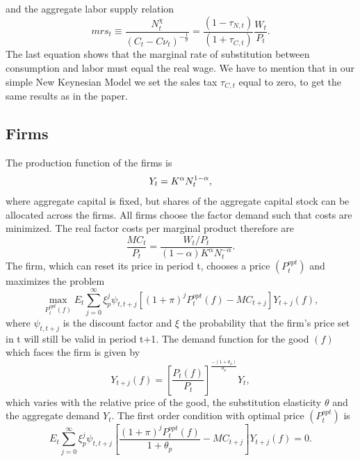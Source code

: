 \documentclass[12pt,a4paper,oneside,titlepage]{article}
\begin{document}
and the aggregate labor supply relation
\begin{equation}
mrs_t \equiv \frac{N_t^\chi}{\left(C_t - C\nu_t\right)^{-\frac{1}{\sigma}}} = \frac{\left(1 - \tau_{N,t}\right)}{\left(1 + \tau_{C,t}\right)} \frac{W_t}{P_t}.
\end{equation}
The last equation shows that the marginal rate of substitution between consumption and labor must equal the real wage. 
We have to mention that in our simple New Keynesian Model we set the sales tax $\tau_{C,t}$ equal to zero, to get the same results as in the paper.

\subsection*{Firms}
The production function of the firms is
\begin{equation}
Y_t = K^\alpha N_t^{1-\alpha},\vspace{-0.3cm} \nonumber
\end{equation}
where aggregate capital is fixed, but shares of the aggregate capital stock can be allocated across the firms. All firms choose the factor demand such that costs are minimized. The real factor costs per marginal product therefore are
\begin{equation}
\frac{MC_t}{P_t} = \frac{W_t/P_t}{\left(1 - \alpha \right) K^\alpha N_t^{-\alpha}}.
\end{equation}
The firm, which can reset its price in period t, chooses a price $\left(P_t^{opt} \right)$ and maximizes the problem
\begin{equation}
\max_{P_t^{opt}\left(f\right)} E_t \sum_{j=0}^\infty \xi_p^j \psi_{t,t+j} \left[ \left(1 + \pi \right)^j P_t^{opt}\left(f\right) - MC_{t+j} \right] Y_{t+j} \left(f\right),\nonumber
\end{equation}
where $\psi_{t,t+j}$ is the discount factor and $\xi$ the probability that the firm's price set in t will still be valid in period t+1. The demand function for the good $\left(f\right)$ which faces the firm is given by 
\begin{equation}
Y_{t+j}\left(f\right) = \left[\frac{P_t \left(f\right)}{P_t} \right]^{\frac{-\left(1+\theta_p\right)}{\theta_p}} Y_t \nonumber,
\end{equation}
which varies with the relative price of the good, the substitution elasticity $\theta$ and the aggregate demand $Y_t$. The first order condition with optimal price $\left(P_t^{opt} \right)$ is
\begin{equation}
E_t \sum_{j=0}^\infty \xi_p^j \psi_{t,t+j} \left[ \frac{\left(1 + \pi \right)^j P_t^{opt}\left(f\right)}{1 + \theta_p} - MC_{t+j} \right] Y_{t+j}\left(f\right) = 0.
\end{equation}
\end{document}
